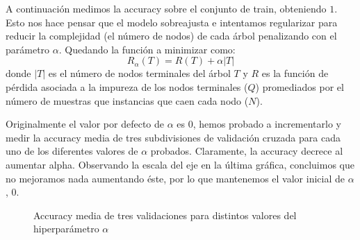 \documentclass[a4]{article}
\begin{document}
A continuación medimos la accuracy sobre el conjunto de train,
obteniendo $1$. Esto nos hace pensar que el modelo sobreajusta e
intentamos regularizar para reducir la complejidad (el número de
nodos) de cada árbol penalizando con el parámetro $\alpha$. Quedando
la función a minimizar como:
\[R_\alpha(T)=R(T)+\alpha|T|\] donde $|T|$ es el número de nodos
terminales del árbol $T$ y $R$ es la función de pérdida asociada a la impureza de los nodos terminales ($Q$) promediados por el número de muestras que instancias que caen cada nodo ($N$).

Originalmente el valor por defecto de $\alpha$ es 0, hemos probado a
incrementarlo y medir la accuracy media de tres subdivisiones de validación cruzada para cada uno de los diferentes valores de $\alpha$ probados. Claramente, la accuracy decrece al aumentar alpha. Observando la escala del eje en la última gráfica, concluimos que no mejoramos nada aumentando éste, por lo que mantenemos el valor inicial de $\alpha$, $0$.

\begin{figure}[H]
  \centering
  \caption{Accuracy media de tres validaciones para distintos valores del hiperparámetro $\alpha$}
  \label{fig:HyperparametersRF}
\end{figure}
\end{document}

